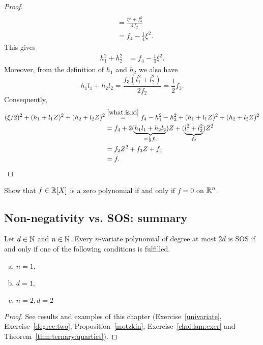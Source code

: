 \begin{proof}
\begin{align*}
		\\ & = \frac{\eta^2 + f_3^2}{4 f_2} 
		\\ & = f_4 - \frac{1}{4} \xi^2. 
	\end{align*}
	This gives
	\begin{align}
		h_1^2 + h_2^2 & = f_4 - \frac{1}{4} \xi^2. \label{what:is:xi}
	\end{align}
	Moreover, from the definition of $h_1$ and $h_2$ we also have 
	\[
	h_1 l_1 + h_2 l_2 = \frac{f_3 (l_1^2 + l_2^2)}{2 f_2} = \frac{1}{2} f_3.
	\]
	Consequently, 
	\begin{align*}
	(\xi/2)^2 + (h_1 + l_1 Z)^2 + (h_2 + l_2 Z)^2 & \stackrel{\eqref{what:is:xi}}{=} f_4 - h_1^2 - h_2^2 + (h_1 + l_1 Z)^2 + (h_2 + l_2 Z)^2 
	\\ & = f_4 + 2 (\underbrace{h_1 l_1 + h_2 l_2}_{=\frac{1}{2} f_3}) Z + (\underbrace{l_1^2 + l_2^2}_{f_2}) Z^2 
	\\ & = f_2 Z^2 + f_3 Z+ f_4 
	\\ & = f. 
	\end{align*}
\end{proof}

\begin{exercise}
	Show that $f \in \mathbb{R}[X]$ is a zero polynomial if and only if $f=0$ on $\mathbb{R}^n$.
\end{exercise} 

\subsection{Non-negativity vs. SOS: summary}

\begin{theorem}
	Let $d \in \mathbb{N}$ and $n \in \mathbb{N}$. Every $n$-variate polynomial of degree at most $2d$ is SOS if and only if one of the following conditions is fulfilled. 
	\begin{enumerate}[(a)]
		\item $n=1$,
		\item $d=1$,
		\item $n=2, d=2$
	\end{enumerate}
\end{theorem}
\begin{proof}
	See results and examples of this chapter (Exercise~\ref{univariate}, Exercise~\ref{degree:two}, Proposition~\ref{motzkin}, Exercise~\ref{choi:lam:exer} and Theorem~\ref{thm:ternary:quartics}).
\end{proof}



